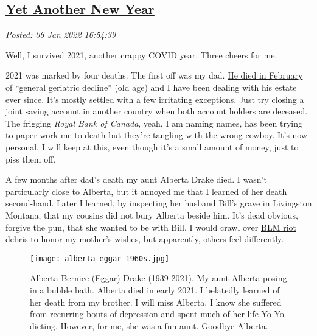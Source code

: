 %

\subsection*{\href{https://analyzethedatanotthedrivel.org/2022/01/06/yet-another-new-year/}{Yet Another New Year}}


\noindent\emph{Posted: 06 Jan 2022 16:54:39}
\vspace{6pt}

Well, I survived 2021, another crappy COVID year. Three cheers for me.

2021 was marked by four deaths. The first off was my dad.
\href{https://analyzethedatanotthedrivel.org/2021/02/21/my-fathers-obituary/}{He
died in February} of ``general geriatric decline'' (old age) and I have
been dealing with his estate ever since. It's mostly settled with a few
irritating exceptions. Just try closing a joint saving account in
another country when both account holders are deceased. The frigging
\emph{Royal Bank of Canada}, yeah, I am naming names, has been trying to
paper-work me to death but they're tangling with the wrong cowboy. It's
now personal, I will keep at this, even though it's a small amount of
money, just to piss them off.~

A few months after dad's death my aunt Alberta Drake died. I wasn't
particularly close to Alberta, but it annoyed me that I learned of her
death second-hand. Later I learned, by inspecting her husband Bill's
grave in Livingston Montana, that my cousins did not bury Alberta beside
him. It's dead obvious, forgive the pun, that she wanted to be with
Bill. I would crawl over
\href{https://townhall.com/tipsheet/katiepavlich/2020/09/08/new-study-shows-majority-of-blm-protests-turned-violent-n2575801}{BLM
riot} debris to honor my mother's wishes, but apparently, others feel
differently.

\captionsetup[figure]{labelformat=empty}
\begin{SCfigure}[50]
\centering
\href{https://conceptcontrol.smugmug.com/People/From-Hazels-Albums-1/i-zNgjGnk/A}{\texttt{[image: alberta-eggar-1960s.jpg]}}
\caption[Alberta Bernice (Eggar) Drake (1939-2021)]{Alberta Bernice (Eggar) Drake (1939-2021). My aunt Alberta
posing in a bubble bath. Alberta died in early 2021. I belatedly learned
of her death from my brother. I will miss Alberta. I know she suffered
from recurring bouts of depression and spent much of her life Yo-Yo
dieting. However, for me, she was a fun aunt. Goodbye Alberta.}
\label{fig:7274x0}
\end{SCfigure}


